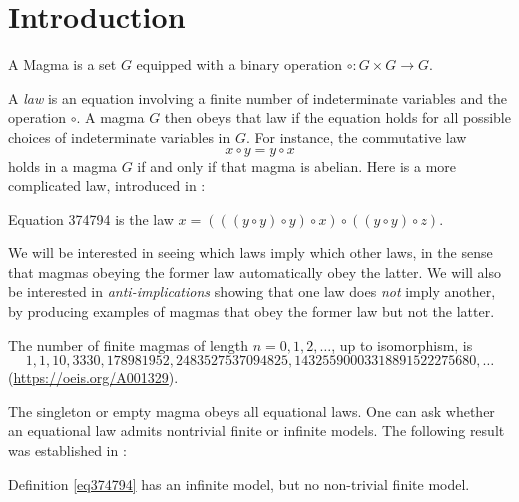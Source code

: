 \chapter{Introduction}

\begin{definition}\label{magma-def}\leanok A Magma is a set $G$ equipped with a binary operation $\circ: G \times G \to G$.
\end{definition}

A \emph{law} is an equation involving a finite number of indeterminate variables and the operation $\circ$.  A magma $G$ then obeys that law if the equation holds for all possible choices of indeterminate variables in $G$.  For instance, the commutative law
$$ x \circ y = y \circ x$$
holds in a magma $G$ if and only if that magma is abelian. Here is a more complicated law, introduced in \cite{Kisielewicz}:


\begin{definition}[Equation 374794]
  \leanok
  \label{eq374794}
  Equation 374794 is the law $x = (((y \circ y) \circ y) \circ x) \circ ((y \circ y) \circ z)$.
\end{definition}

We will be interested in seeing which laws imply which other laws, in the sense that magmas obeying the former law automatically obey the latter.  We will also be interested in \emph{anti-implications} showing that one law does \emph{not} imply another, by producing examples of magmas that obey the former law but not the latter.

The number of finite magmas of length $n=0,1,2,\dots$, up to isomorphism, is
$$ 1, 1, 10, 3330, 178981952, 2483527537094825, 14325590003318891522275680, \dots$$
(\href{OEIS A001329}{https://oeis.org/A001329}).

The singleton or empty magma obeys all equational laws.  One can ask whether an equational law admits nontrivial finite or infinite models.  The following result was established in \cite{Kisielewicz}:

\begin{theorem}
  \leanok
  \label{kis-thm}
  Definition \ref{eq374794} has an infinite model, but no non-trivial finite model.
\end{theorem}

